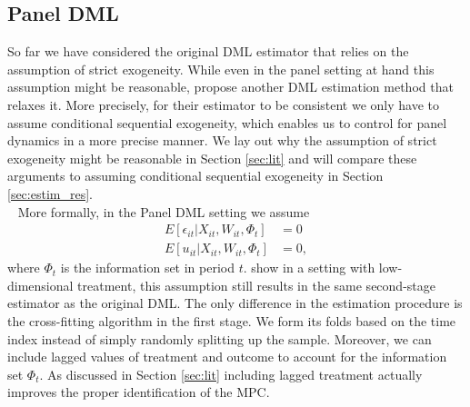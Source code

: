\subsection{Panel DML} \label{sec:Panel DML}
So far we have considered the original DML estimator that relies on the assumption of strict exogeneity. While even in the panel setting at hand this assumption might be reasonable, \cite{PanelDML} propose another DML estimation method that relaxes it. More precisely, for their estimator to be consistent we only have to assume conditional sequential exogeneity, which enables us to control for panel dynamics in a more precise manner. We lay out why the assumption of strict exogeneity might be reasonable in Section \ref{sec:lit} and will compare these arguments to assuming conditional sequential exogeneity in Section \ref{sec:estim_res}. \\ 
More formally, in the Panel DML setting we assume
\begin{align*}
    E[\epsilon_{it}|X_{it}, W_{it}, \Phi_{t}]&=0 \\ 
    E[u_{it}|X_{it}, W_{it}, \Phi_{t}]&=0,
\end{align*}
where $\Phi_t$ is the information set in period $t$. \cite{PanelDML} show in a setting with low-dimensional treatment, this assumption still results in the same second-stage estimator as the original DML. The only difference in the estimation procedure is the cross-fitting algorithm in the first stage. We form its folds based on the time index instead of simply randomly splitting up the sample. Moreover, we can include lagged values of treatment and outcome to account for the information set $\Phi_t$. As discussed in Section \ref{sec:lit} including lagged treatment actually improves the proper identification of the MPC. 

